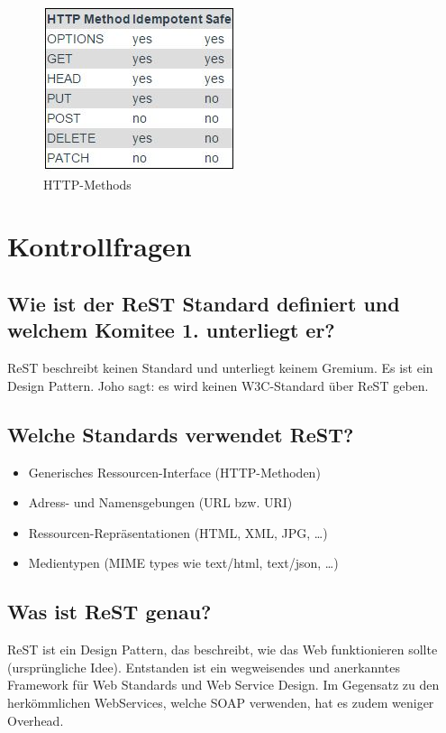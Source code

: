 \begin{figure}[h!]
\centering
\includegraphics[width=0.5\linewidth]{fig/rest-methods}
\caption{HTTP-Methods}
\label{fig:rest-methods}
\end{figure}

\newpage

\section{Kontrollfragen}

\subsection{Wie ist der ReST Standard definiert und welchem Komitee 1. unterliegt er?}
ReST beschreibt keinen Standard und unterliegt keinem Gremium. Es ist ein Design Pattern. Joho sagt: es wird keinen W3C-Standard über ReST geben.

\subsection{Welche Standards verwendet ReST?}
\begin{itemize}
	\item Generisches Ressourcen-Interface (HTTP-Methoden)
	\item Adress- und Namensgebungen (URL bzw. URI)
	\item Ressourcen-Repräsentationen (HTML, XML, JPG, …)
	\item Medientypen (MIME types wie text/html, text/json, …)
\end{itemize}

\subsection{Was ist ReST genau?}
ReST ist ein Design Pattern, das beschreibt, wie das Web funktionieren sollte (ursprüngliche Idee). Entstanden ist ein wegweisendes und anerkanntes Framework für Web Standards und Web Service Design. Im Gegensatz zu den herkömmlichen WebServices, welche SOAP verwenden, hat es zudem weniger Overhead.

